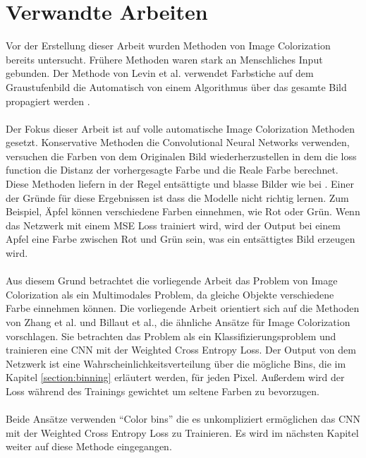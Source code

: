 \section{Verwandte Arbeiten}\label{subsection:verwandte-arbeiten}
Vor der Erstellung dieser Arbeit wurden Methoden von Image Colorization bereits untersucht. Frühere Methoden waren stark an Menschliches Input
gebunden. Der Methode von Levin et al. verwendet Farbstiche auf dem Graustufenbild die Automatisch von einem Algorithmus über das gesamte 
Bild propagiert werden \cite{10.1145/1015706.1015780}.
\\
\\
Der Fokus dieser Arbeit ist auf volle automatische Image Colorization Methoden gesetzt. Konservative Methoden die Convolutional Neural Networks verwenden,
versuchen die Farben von dem Originalen Bild wiederherzustellen in dem die \gls{loss function} die Distanz der vorhergesagte Farbe und die 
Reale Farbe berechnet. Diese Methoden liefern in der Regel entsättigte und blasse Bilder wie bei \cite{zbulak2019image}. Einer der Gründe 
für diese Ergebnissen ist dass die Modelle nicht richtig lernen. Zum Beispiel, Äpfel können verschiedene Farben einnehmen, wie Rot oder Grün. Wenn das 
Netzwerk mit einem MSE Loss trainiert wird, wird der Output bei einem Apfel eine Farbe zwischen Rot und Grün sein, was ein entsättigtes Bild erzeugen wird.
\\
\\
Aus diesem Grund betrachtet die vorliegende Arbeit das Problem von Image Colorization als ein Multimodales Problem, da gleiche Objekte verschiedene Farbe 
einnehmen können.
Die vorliegende Arbeit orientiert sich auf die Methoden von Zhang et al. und Billaut et al., die ähnliche Ansätze für Image Colorization vorschlagen.
Sie betrachten das Problem als ein Klassifizierungsproblem und trainieren eine CNN mit der Weighted Cross Entropy Loss. Der Output von dem Netzwerk ist 
eine Wahrscheinlichkeitsverteilung über die mögliche Bins, die im Kapitel \ref{section:binning} erläutert werden, für jeden Pixel. Außerdem wird der Loss während des Trainings gewichtet um seltene 
Farben zu bevorzugen.
\\
\\
Beide Ansätze verwenden ``Color \gls{bin}s'' die es unkompliziert ermöglichen das CNN mit der Weighted Cross Entropy Loss zu Trainieren. 
Es wird im nächsten Kapitel weiter auf diese Methode eingegangen.
